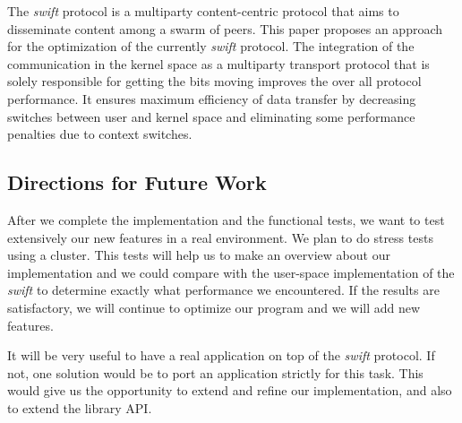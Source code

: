 
The \emph{swift} protocol is a multiparty content-centric protocol that aims to disseminate content among a swarm of
peers. This paper proposes an approach for the optimization of the currently \emph{swift} protocol. The integration of
the communication in the kernel space as a multiparty transport protocol that is solely responsible for getting the
bits moving improves the over all protocol performance. It ensures maximum efficiency of data transfer by decreasing
switches between user and kernel space and eliminating some performance penalties due to context switches.

\subsection*{Directions for Future Work}


After we complete the implementation and the functional tests, we want to test extensively our new features in a real
environment. We plan to do stress tests using a cluster. This tests will help us to make an overview about our
implementation and we could compare with the user-space implementation of the \emph{swift} to determine exactly what
performance we encountered. If the results are satisfactory, we will continue to optimize our program and we will add
new features.

It will be very useful to have a real application on top of the \emph{swift} protocol. If not, one solution would be to
port an application strictly for this task. This would give us the opportunity to extend and refine our implementation,
and also to extend the library API.

